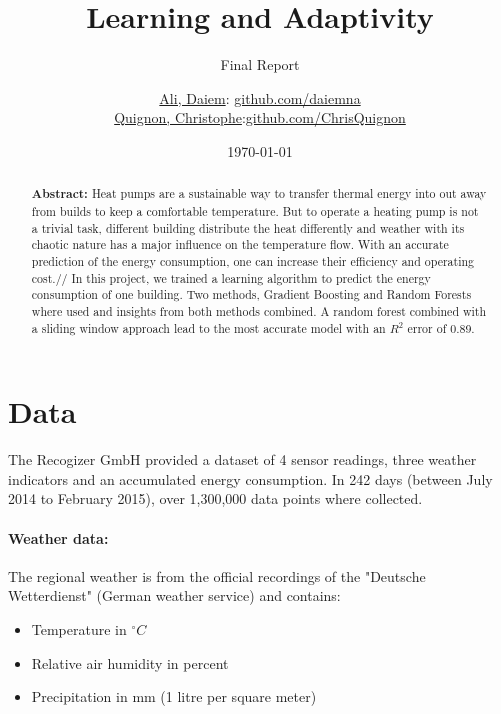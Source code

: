 \documentclass{scrartcl}
\begin{document}
\title{Learning and Adaptivity}
\subtitle{Final Report}
\author{
  \href{daiem.ali@smail.inf.h-brs.de}{Ali, Daiem}: \href{https://github.com/daiemna}{github.com/daiemna}\\
  \href{christophe.quignon@smail.inf.h-brs.de}{Quignon, Christophe}:\href{https://github.com/ChrisQuignon}{github.com/ChrisQuignon}
}
\date{\today}


\maketitle


\begin{abstract}
\textbf{Abstract:}
Heat pumps are a sustainable way to transfer thermal energy into out away from builds to keep a comfortable temperature. But to operate a heating pump is not a trivial task, different building distribute the heat differently and weather with its chaotic nature has a major influence on the temperature flow. With an accurate prediction of the energy consumption, one can increase their efficiency and operating cost.//
In this project, we trained a learning algorithm to predict the energy consumption of one building. Two methods, Gradient Boosting and Random Forests where used and insights from both methods combined. A random forest combined with a sliding window approach lead to the most accurate model with an $R^{2}$ error of 0.89.
\end{abstract}

\section{Data}
\label{sec:data}

The Recogizer GmbH provided a dataset of 4 sensor readings, three weather indicators and an accumulated energy consumption. In 242 days (between July 2014 to February 2015), over 1,300,000 data points where collected.

\paragraph{Weather data:}
The regional weather is from the official recordings of the "Deutsche Wetterdienst" (German weather service) and contains:

\begin{itemize}
\item Temperature in $^\circ C$
\item Relative air humidity in percent
\item Precipitation in mm (1 litre per square meter)
\end{itemize}
\end{document}
